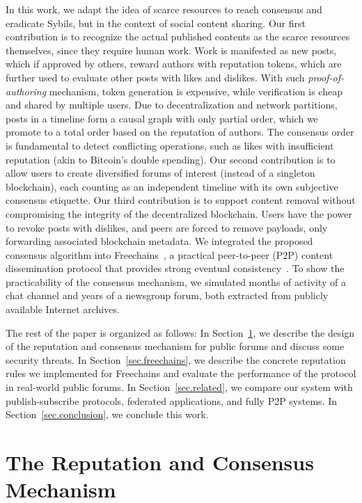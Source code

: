 \documentclass[12pt]{article}
\newcommand{\FC}       {Freechains\xspace}
\begin{document}
In this work, we adapt the idea of scarce resources to reach consensus and
eradicate Sybils, but in the context of social content sharing.
%
Our first contribution is to recognize the actual published contents as the
scarce resources themselves, since they require human work.
%
Work is manifested as new posts, which if approved by others, reward authors
with reputation tokens, which are further used to evaluate other posts with
likes and dislikes.
With such \emph{proof-of-authoring} mechanism, token generation is expensive,
while verification is cheap and shared by multiple users.
%
Due to decentralization and network partitions, posts in a timeline form a
causal graph with only partial order, which we promote to a total order based
on the reputation of authors.
The consensus order is fundamental to detect conflicting operations, such as
likes with insufficient reputation (akin to Bitcoin's double spending).
%
Our second contribution is to allow users to create diversified forums of
interest (instead of a singleton blockchain), each counting as an independent
timeline with its own subjective consensus etiquette.
%
Our third contribution is to support content removal without compromising the
integrity of the decentralized blockchain.
Users have the power to revoke posts with dislikes, and peers are forced to
remove payloads, only forwarding associated blockchain metadata.
%
We integrated the proposed consensus algorithm into \FC~\cite{fcs.sbseg20}, a
practical peer-to-peer (P2P) content dissemination protocol that provides
strong eventual consistency~\cite{p2p.sec}.
To show the practicability of the consensus mechanism, we simulated months of
activity of a chat channel and years of a newsgroup forum, both extracted from
publicly available Internet archives.

The rest of the paper is organized as follows:
In Section~\ref{sec.design}, we describe the design of the reputation and
consensus mechanism for public forums and discuss some security threats.
In Section~\ref{sec.freechains}, we describe the concrete reputation rules we
implemented for \FC and evaluate the performance of the protocol in real-world
public forums.
In Section~\ref{sec.related}, we compare our system with publish-subscribe
protocols, federated applications, and fully P2P systems.
In Section~\ref{sec.conclusion}, we conclude this work.

\section{The Reputation and Consensus Mechanism}
\label{sec.design}
\end{document}
